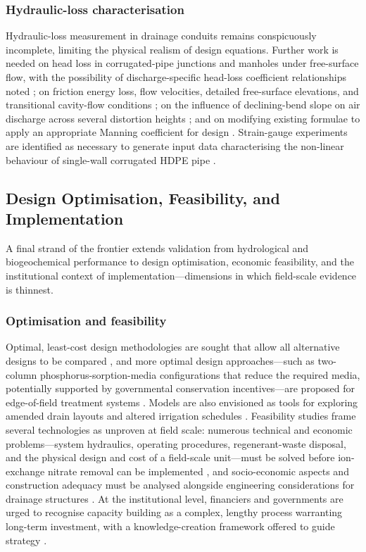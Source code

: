 \subsubsection{Hydraulic-loss characterisation}

Hydraulic-loss measurement in drainage conduits remains conspicuously incomplete, limiting the physical realism of design equations. Further work is needed on head loss in corrugated-pipe junctions and manholes under free-surface flow, with the possibility of discharge-specific head-loss coefficient relationships noted \parencite{Bayat2011}; on friction energy loss, flow velocities, detailed free-surface elevations, and transitional cavity-flow conditions \parencite{Nédélec2008}; on the influence of declining-bend slope on air discharge across several distortion heights \parencite{Gurklys2008}; and on modifying existing formulae to apply an appropriate Manning coefficient for design \parencite{Kouchakzadeh2011}. Strain-gauge experiments are identified as necessary to generate input data characterising the non-linear behaviour of single-wall corrugated HDPE pipe \parencite{Gaj2021}.

\subsection{Design Optimisation, Feasibility, and Implementation}

A final strand of the frontier extends validation from hydrological and biogeochemical performance to design optimisation, economic feasibility, and the institutional context of implementation---dimensions in which field-scale evidence is thinnest.

\subsubsection{Optimisation and feasibility}

Optimal, least-cost design methodologies are sought that allow all alternative designs to be compared \parencite{Bakour2021}, and more optimal design approaches---such as two-column phosphorus-sorption-media configurations that reduce the required media, potentially supported by governmental conservation incentives---are proposed for edge-of-field treatment systems \parencite{Hauda2020}. Models are also envisioned as tools for exploring amended drain layouts and altered irrigation schedules \parencite{Alzraiee2013b}. Feasibility studies frame several technologies as unproven at field scale: numerous technical and economic problems---system hydraulics, operating procedures, regenerant-waste disposal, and the physical design and cost of a field-scale unit---must be solved before ion-exchange nitrate removal can be implemented \parencite{MAGETTE1990}, and socio-economic aspects and construction adequacy must be analysed alongside engineering considerations for drainage structures \parencite{Bozic2014}. At the institutional level, financiers and governments are urged to recognise capacity building as a complex, lengthy process warranting long-term investment, with a knowledge-creation framework offered to guide strategy \parencite{Ritzema2008}.

